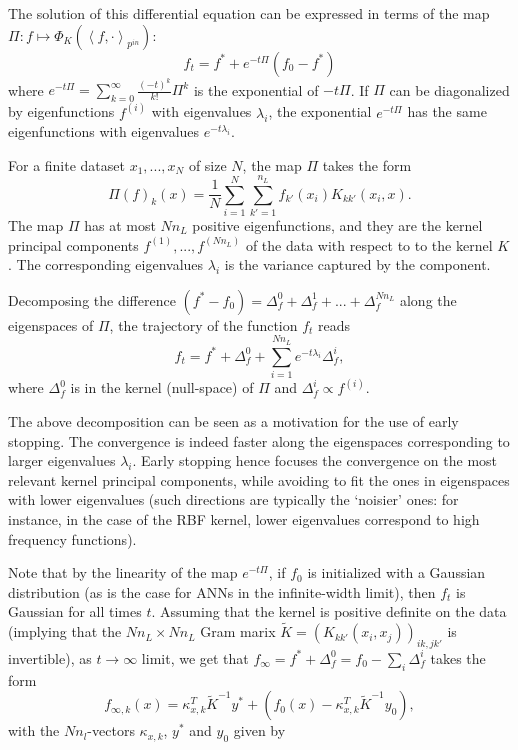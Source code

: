 The solution of this differential equation can be expressed in terms of the map $\Pi : f \mapsto \Phi_K \left(\left<f, \cdot \right>_{p^{in}}\right)$:
$$
 f_t = f^* + e^{-t \Pi}(f_0 - f^*) $$ where $e^{-t \Pi} = \sum_{k=0}^{\infty} \frac{(-t)^k}{k!} \Pi^k$ is the exponential of $-t \Pi$. If $\Pi$ can be diagonalized by eigenfunctions $f^{(i)}$ with eigenvalues $\lambda_i$, the exponential $e^{-t \Pi}$ has the same eigenfunctions with eigenvalues $e^{-t \lambda_i}$.

For a finite dataset $x_1, ..., x_N$ of size $N$, the map $\Pi$ takes the form $$
\Pi(f)_k (x) = \frac{1}{N} \sum_{i=1}^N \sum_{k'=1}^{n_L} f_{k'}(x_i) K_{kk'}(x_i, x). $$ The map $\Pi$ has at most $Nn_L$ positive eigenfunctions, and they are the kernel principal components $f^{(1)}, ..., f^{(N n_L)}$ of the data with respect to to the kernel $K$ \cite{Scholkopf, Shawe-Taylor}. The corresponding eigenvalues $\lambda_i$ is the variance captured by the component.

Decomposing the difference $(f^* - f_0) = \Delta^0_f + \Delta^1_f + ... + \Delta^{N n_L}_f$ along the eigenspaces of $\Pi$, the trajectory of the function $f_t$ reads $$ f_{t} = f^* + \Delta^0_f + \sum_{i=1}^{N n_L} e^{-t \lambda_i} \Delta^i_f,
$$
where $\Delta^0_f$ is in the kernel (null-space) of $\Pi$ and $\Delta^i_f \propto f^{(i)}$. 

The above decomposition can be seen as a motivation for the use of early stopping. The convergence is indeed faster along the eigenspaces corresponding to larger eigenvalues $\lambda_i$. Early stopping hence focuses the convergence on the most relevant kernel principal components, while avoiding to fit the ones in eigenspaces with lower eigenvalues (such directions are typically the `noisier' ones: for instance, in the case of the RBF kernel, lower eigenvalues correspond to high frequency functions).

Note that by the linearity of the map $e^{-t \Pi}$, if $f_0$ is initialized with a Gaussian distribution (as is the case for ANNs in the infinite-width limit), then $f_t$ is Gaussian for all times $t$. Assuming that the kernel is positive definite on the data (implying that the $Nn_L \times Nn_L$ Gram marix $\tilde{K}=\left(K_{kk'}(x_i, x_j) \right)_{ik, jk'}$ is invertible), as $t \to \infty$ limit, we get that $f_\infty = f^* + \Delta^0_f = f_0 - \sum_i \Delta^i_f$ takes the form $$
 f_{\infty, k}(x) = \kappa_{x, k}^T \tilde{K}^{-1} y^* + \left(f_0(x) - \kappa_{x, k}^T \tilde{K}^{-1} y_0\right),
$$
with the $N n_l$-vectors $ \kappa_{x, k} $, $ y^* $ and $ y_0  $ given by

